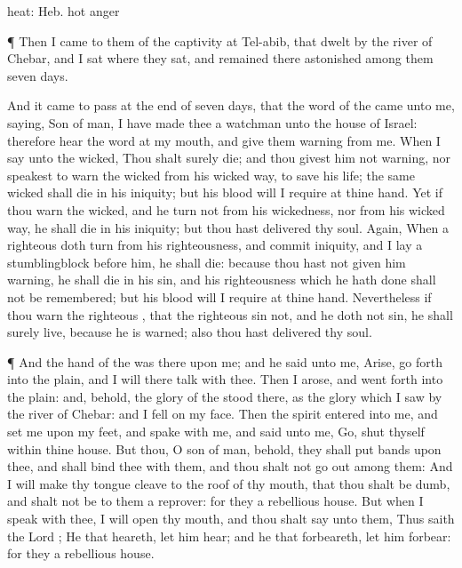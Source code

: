 {{heat: Heb. hot anger}
\par }{\PP {}¶ Then I
came to them of the
captivity at
Tel-abib, that
dwelt by the
river of
Chebar, and I
sat where they
sat, and
remained there
astonished
among them
seven
days.
\par }{\PP {}And it came to pass at the
end of
seven
days, that the
word of the
{} came unto me,
saying,
Son of
man, I have
made thee a
watchman unto the
house of
Israel: therefore
hear the
word at my
mouth, and give them
warning from me.
When I
say unto the
wicked, Thou shalt
surely
die; and thou givest him not
warning, nor
speakest to
warn the
wicked from his
wicked
way, to save his
life; the same
wicked
{} shall
die in his
iniquity; but his
blood will I
require at thine
hand.
Yet if thou
warn the
wicked, and he
turn not from his
wickedness, nor from his
wicked
way, he shall
die in his
iniquity; but thou hast
delivered thy
soul.
Again, When a
righteous
{} doth
turn from his
righteousness, and
commit
iniquity, and I
lay a
stumblingblock
before him, he shall
die: because thou hast not given him
warning, he shall
die in his
sin, and his
righteousness which he hath
done shall not be
remembered; but his
blood will I
require at thine
hand.
Nevertheless if thou
warn the
righteous
{}, that the
righteous
sin not, and he doth not
sin, he shall
surely
live, because he is
warned; also thou hast
delivered thy
soul.
\par }{\PP {}¶ And the
hand of the
{} was there upon me; and he
said unto me,
Arise, go
forth into the
plain, and I will there
talk with thee.
Then I
arose, and went
forth into the
plain: and, behold, the
glory of the
{}
stood there, as the
glory which I
saw by the
river of
Chebar: and I
fell on my
face.
Then the
spirit
entered into me, and
set me upon my
feet, and
spake with me, and
said unto me,
Go,
shut thyself
within thine
house.
But thou, O
son of
man, behold, they shall
put
bands upon thee, and shall
bind thee with them, and thou shalt not go
out
among them:
And I will make thy
tongue
cleave to the roof of thy
mouth, that thou shalt be
dumb, and shalt not be to them a
reprover: for they
{} a
rebellious
house.
But when I
speak
with thee, I will
open thy
mouth, and thou shalt
say unto them, Thus
saith the
Lord
{}; He that
heareth, let him
hear; and he that
forbeareth, let him
forbear: for they
{} a
rebellious
house.

}
